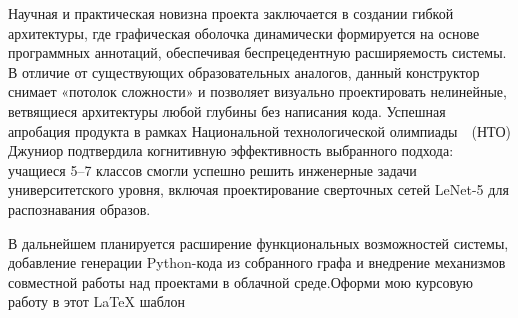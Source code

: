 \documentclass{report}
\begin{document}
Научная и практическая новизна проекта заключается в создании гибкой архитектуры, где графическая оболочка динамически формируется на основе программных аннотаций, обеспечивая беспрецедентную расширяемость системы. В отличие от существующих образовательных аналогов, данный конструктор снимает «потолок сложности» и позволяет визуально проектировать нелинейные, ветвящиеся архитектуры любой глубины без написания кода. Успешная апробация продукта в рамках Национальной технологической олимпиады~\cite{bib_nto_junior}~(НТО) Джуниор подтвердила когнитивную эффективность выбранного подхода: учащиеся 5–7 классов смогли успешно решить инженерные задачи университетского уровня, включая проектирование сверточных сетей LeNet-5 для распознавания образов.

В дальнейшем планируется расширение функциональных возможностей системы, добавление генерации Python-кода из собранного графа и внедрение механизмов совместной работы над проектами в облачной среде.Оформи мою курсовую работу в этот LaTeX шаблон
\end{document}
